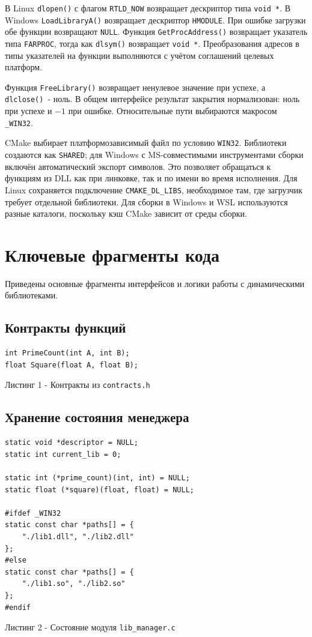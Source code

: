 \documentclass[12pt,a4paper]{article}
\begin{document}
В Linux \texttt{dlopen()} с флагом \texttt{RTLD\_NOW} возвращает дескриптор типа \texttt{void *}. В Windows \texttt{LoadLibraryA()} возвращает дескриптор \texttt{HMODULE}. При ошибке загрузки обе функции возвращают \texttt{NULL}. Функция \texttt{GetProcAddress()} возвращает указатель типа \texttt{FARPROC}, тогда как \texttt{dlsym()} возвращает \texttt{void *}. Преобразования адресов в типы указателей на функции выполняются с учётом соглашений целевых платформ.

Функция \texttt{FreeLibrary()} возвращает ненулевое значение при успехе, а \texttt{dlclose()}~- ноль. В общем интерфейсе результат закрытия нормализован: ноль при успехе и $-1$ при ошибке. Относительные пути выбираются макросом \texttt{\_WIN32}.

CMake выбирает платформозависимый файл по условию \texttt{WIN32}. Библиотеки создаются как \texttt{SHARED}; для Windows с MS-совместимыми инструментами сборки включён автоматический экспорт символов. Это позволяет обращаться к функциям из DLL как при линковке, так и по имени во время исполнения. Для Linux сохраняется подключение \texttt{CMAKE\_DL\_LIBS}, необходимое там, где загрузчик требует отдельной библиотеки. Для сборки в Windows и WSL используются разные каталоги, поскольку кэш CMake зависит от среды сборки.

\section{Ключевые фрагменты кода}
Приведены основные фрагменты интерфейсов и логики работы с динамическими библиотеками.

\subsection{Контракты функций}
\begin{lstlisting}
int PrimeCount(int A, int B);
float Square(float A, float B);
\end{lstlisting}
\begin{center}\small Листинг 1 - Контракты из \texttt{contracts.h}\end{center}

\subsection{Хранение состояния менеджера}
\begin{lstlisting}
static void *descriptor = NULL;
static int current_lib = 0;

static int (*prime_count)(int, int) = NULL;
static float (*square)(float, float) = NULL;

#ifdef _WIN32
static const char *paths[] = {
    "./lib1.dll", "./lib2.dll"
};
#else
static const char *paths[] = {
    "./lib1.so", "./lib2.so"
};
#endif
\end{lstlisting}
\begin{center}\small Листинг 2 - Состояние модуля \texttt{lib\_manager.c}\end{center}
\end{document}
